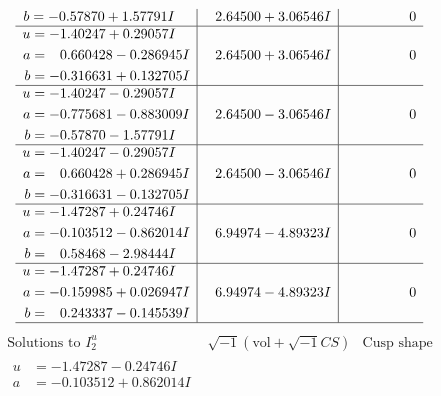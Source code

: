 \documentclass[1p]{elsarticle_modified}
\theoremstyle{definition}
\newcommand{\I}{\sqrt{-1}}
\begin{document}
$$\begin{array}{c|c|c}
\begin{aligned}
b &= -0.57870 + 1.57791 I\end{aligned}
 & \phantom{-}2.64500 + 3.06546 I & \phantom{-0.000000 } 0 \\ \hline\begin{aligned}
u &= -1.40247 + 0.29057 I \\
a &= \phantom{-}0.660428 - 0.286945 I \\
b &= -0.316631 + 0.132705 I\end{aligned}
 & \phantom{-}2.64500 + 3.06546 I & \phantom{-0.000000 } 0 \\ \hline\begin{aligned}
u &= -1.40247 - 0.29057 I \\
a &= -0.775681 - 0.883009 I \\
b &= -0.57870 - 1.57791 I\end{aligned}
 & \phantom{-}2.64500 - 3.06546 I & \phantom{-0.000000 } 0 \\ \hline\begin{aligned}
u &= -1.40247 - 0.29057 I \\
a &= \phantom{-}0.660428 + 0.286945 I \\
b &= -0.316631 - 0.132705 I\end{aligned}
 & \phantom{-}2.64500 - 3.06546 I & \phantom{-0.000000 } 0 \\ \hline\begin{aligned}
u &= -1.47287 + 0.24746 I \\
a &= -0.103512 - 0.862014 I \\
b &= \phantom{-}0.58468 - 2.98444 I\end{aligned}
 & \phantom{-}6.94974 - 4.89323 I & \phantom{-0.000000 } 0 \\ \hline\begin{aligned}
u &= -1.47287 + 0.24746 I \\
a &= -0.159985 + 0.026947 I \\
b &= \phantom{-}0.243337 - 0.145539 I\end{aligned}
 & \phantom{-}6.94974 - 4.89323 I & \phantom{-0.000000 } 0\\
 \hline 
 \end{array}$$\newpage$$\begin{array}{c|c|c}  
\text{Solutions to }I^u_{2}& \I (\text{vol} + \sqrt{-1}CS) & \text{Cusp shape}\\
 \hline 
\begin{aligned}
u &= -1.47287 - 0.24746 I \\
a &= -0.103512 + 0.862014 I \\

\end{aligned}
\end{array}$$
\end{document}
